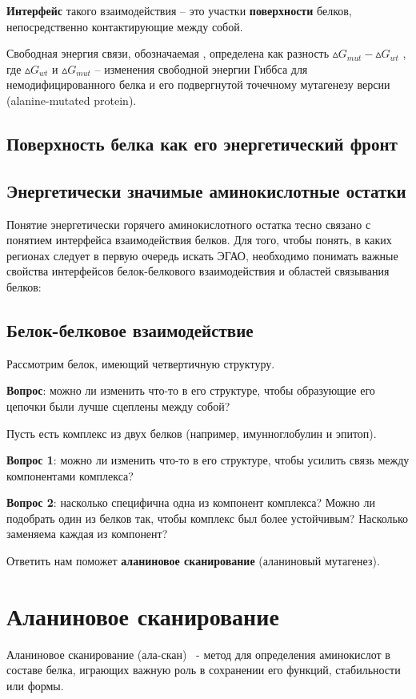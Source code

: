 \textbf{Интерфейс} такого взаимодействия -- это участки \textbf{поверхности} белков, непосредственно контактирующие между собой.

Свободная энергия связи, обозначаемая \ddG, определена как разность $\vartriangle\!G_{mut} - \vartriangle\!G_{wt}$ , где $\vartriangle\!G_{wt}$ и $\vartriangle\!G_{mut}$ -- изменения свободной энергии Гиббса для немодифицированного белка и его подвергнутой точечному мутагенезу версии (alanine-mutated
protein).
\subsection{Поверхность белка как его энергетический фронт}
\subsection{Энергетически значимые аминокислотные остатки}
Понятие энергетически горячего аминокислотного остатка тесно связано с понятием интерфейса взаимодействия белков. Для того, чтобы понять, в каких регионах следует в первую очередь искать ЭГАО, необходимо понимать важные свойства интерфейсов белок-белкового взаимодействия и областей связывания белков:
\subsection{Белок-белковое взаимодействие}

Рассмотрим белок, имеющий четвертичную структуру.

\textbf{Вопрос}: можно ли изменить что-то в его структуре, чтобы образующие его цепочки были лучше сцеплены между собой?

Пусть есть комплекс из двух белков (например, имунноглобулин и эпитоп).

\textbf{Вопрос 1}: можно ли изменить что-то в его структуре, чтобы усилить связь между компонентами комплекса?

\textbf{Вопрос 2}: насколько специфична одна из компонент комплекса?  Можно ли подобрать один из белков так, чтобы комплекс был более устойчивым? Насколько заменяема каждая из компонент?

Ответить нам поможет \textbf{аланиновое сканирование} (аланиновый мутагенез).
\newpage
\section{Аланиновое сканирование}
Аланиновое сканирование (ала-скан)~\cite{alascan2001} - метод для определения аминокислот в составе белка, играющих важную роль в сохранении его функций, стабильности или формы.

